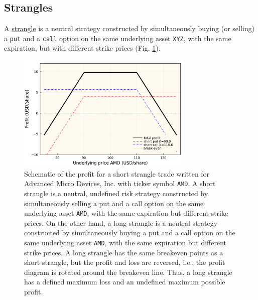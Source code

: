 \documentclass[11pt]{article}
\theoremstyle{definition}
\begin{document}
\subsection*{Strangles}
A \href{https://www.investopedia.com/terms/s/strangle.asp}{strangle} is a neutral strategy constructed by simultaneously buying (or selling)
a \texttt{put} and a \texttt{call} option on the same underlying asset \texttt{XYZ}, with the same expiration, but with different strike prices (Fig. \ref{fig:options-short-strangle-profit}).

\begin{figure}[h]
    \centering
    \includegraphics[width=0.75\textwidth]{./figs/Fig-AMD-Profit-Short-Strangle.pdf}
    \caption{Schematic of the profit for a short strangle trade written for Advanced Micro Devices, Inc. with ticker symbol \texttt{AMD}.
	A short strangle is a neutral, undefined risk strategy constructed by simultaneously selling a put and a call option on the same underlying asset \texttt{AMD}, with the same expiration but different strike prices.
	On the other hand, a long strangle is a neutral strategy constructed by simultaneously buying a put and a call option on the same underlying asset \texttt{AMD}, with the same expiration but different strike prices.
	A long strangle has the same breakeven points as a short strangle, but the profit and loss are reversed, i.e., the profit diagram is rotated around the breakeven line.
	Thus, a long strangle has a defined maximum loss and an undefined maximum possible profit.
	}\label{fig:options-short-strangle-profit}
\end{figure}
\end{document}
